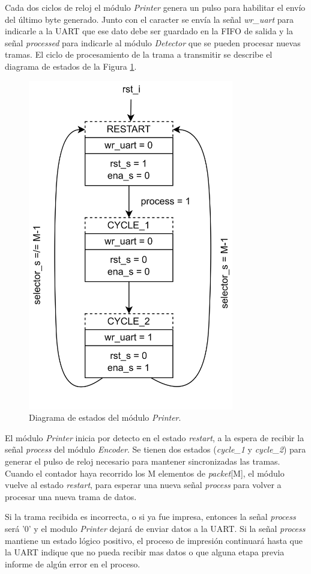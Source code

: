 	Cada dos ciclos de reloj el módulo \textit{Printer} genera un pulso para habilitar el envío del último byte generado. Junto con el caracter se envía la señal \textit{wr\_uart} para indicarle a la UART que ese dato debe ser guardado en la FIFO de salida y la señal \textit{processed} para indicarle al módulo \textit{Detector} que se pueden procesar nuevas tramas. El ciclo de procesamiento de la trama a transmitir se describe el diagrama de estados de la Figura \ref{fig:Printer_FSMD}.
	
	\begin{figure}[H]
		\centering
		\includegraphics[width=0.8\textwidth]{Figuras/Printer_FSMD.png}
		\centering\caption{Diagrama de estados del módulo \textit{Printer}.}
		\label{fig:Printer_FSMD}
	\end{figure}
	
	El módulo \textit{Printer} inicia por detecto en el estado \textit{restart}, a la espera de recibir la señal \textit{process} del módulo \textit{Encoder}. Se tienen dos estados (\textit{cycle\_1} y \textit{cycle\_2}) para generar el pulso de reloj necesario para mantener sincronizadas las tramas. Cuando el contador haya recorrido los M elementos de \textit{packet}[M], el módulo vuelve al estado \textit{restart}, para esperar una nueva señal \textit{process} para volver a procesar una nueva trama de datos.
	
	Si la trama recibida es incorrecta, o si ya fue impresa, entonces la señal \textit{process} será '0' y el modulo \textit{Printer} dejará de enviar datos a la UART. Si la señal \textit{process} mantiene un estado lógico positivo, el proceso de impresión continuará hasta que la UART indique que no pueda recibir mas datos o que alguna etapa previa informe de algún error en el proceso.